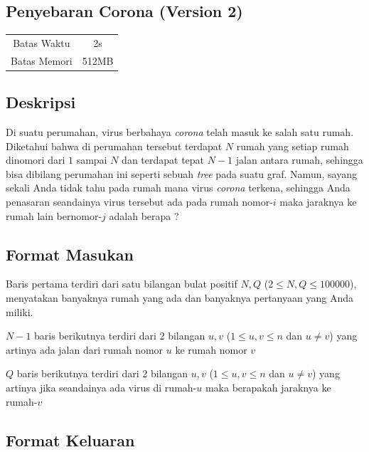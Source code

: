 \documentclass{article}
\begin{document}
\begin{center}
    \section*{Penyebaran Corona (Version 2)} %

    \begin{tabular}{ | c c | }
        \hline
        Batas Waktu  & 2s \\    %
        Batas Memori & 512MB \\  %
        \hline
    \end{tabular}
\end{center}

\subsection*{Deskripsi}

Di suatu perumahan, virus berbahaya \textit{corona} telah masuk ke salah satu rumah. Diketahui bahwa di perumahan tersebut terdapat $N$ rumah yang setiap rumah dinomori dari $1$ sampai $N$ dan terdapat tepat $N - 1$ jalan antara rumah, sehingga bisa dibilang perumahan ini seperti sebuah \textit{tree} pada suatu graf. Namun, sayang sekali Anda tidak tahu pada rumah mana virus \textit{corona} terkena, sehingga Anda penasaran seandainya virus tersebut ada pada rumah nomor-$i$ maka jaraknya ke rumah lain bernomor-$j$ adalah berapa ?

\subsection*{Format Masukan}

Baris pertama terdiri dari satu bilangan bulat positif $N, Q$ ($2 \leq N, Q \leq 100000$), menyatakan banyaknya rumah yang ada dan banyaknya pertanyaan yang Anda miliki.

$N-1$ baris berikutnya terdiri dari 2 bilangan $u, v$ ($1 \leq u, v \leq n$ dan $u \neq v$) yang artinya ada jalan dari rumah nomor $u$ ke rumah nomor $v$

$Q$ baris berikutnya terdiri dari 2 bilangan $u, v$ ($1 \leq u, v \leq n$ dan $u \neq v$) yang artinya jika seandainya ada virus di rumah-$u$ maka berapakah jaraknya ke rumah-$v$

\subsection*{Format Keluaran}
\end{document}

